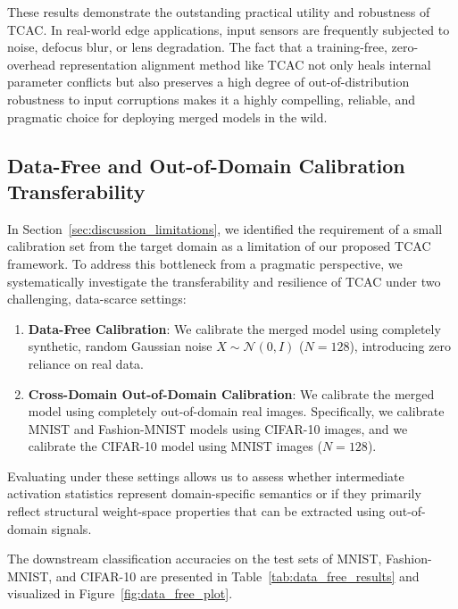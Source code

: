 \documentclass{article}
\theoremstyle{plain}
\theoremstyle{definition}
\theoremstyle{remark}
\begin{document}
These results demonstrate the outstanding practical utility and robustness of TCAC. In real-world edge applications, input sensors are frequently subjected to noise, defocus blur, or lens degradation. The fact that a training-free, zero-overhead representation alignment method like TCAC not only heals internal parameter conflicts but also preserves a high degree of out-of-distribution robustness to input corruptions makes it a highly compelling, reliable, and pragmatic choice for deploying merged models in the wild.

\subsection{Data-Free and Out-of-Domain Calibration Transferability}
\label{sec:appendix_data_free}

In Section~\ref{sec:discussion_limitations}, we identified the requirement of a small calibration set from the target domain as a limitation of our proposed TCAC framework. To address this bottleneck from a pragmatic perspective, we systematically investigate the transferability and resilience of TCAC under two challenging, data-scarce settings:
\begin{enumerate}
    \item \textbf{Data-Free Calibration}: We calibrate the merged model using completely synthetic, random Gaussian noise $X \sim \mathcal{N}(0, I)$ ($N=128$), introducing zero reliance on real data.
    \item \textbf{Cross-Domain Out-of-Domain Calibration}: We calibrate the merged model using completely out-of-domain real images. Specifically, we calibrate MNIST and Fashion-MNIST models using CIFAR-10 images, and we calibrate the CIFAR-10 model using MNIST images ($N=128$).
\end{enumerate}
Evaluating under these settings allows us to assess whether intermediate activation statistics represent domain-specific semantics or if they primarily reflect structural weight-space properties that can be extracted using out-of-domain signals.

The downstream classification accuracies on the test sets of MNIST, Fashion-MNIST, and CIFAR-10 are presented in Table~\ref{tab:data_free_results} and visualized in Figure~\ref{fig:data_free_plot}.
\end{document}
